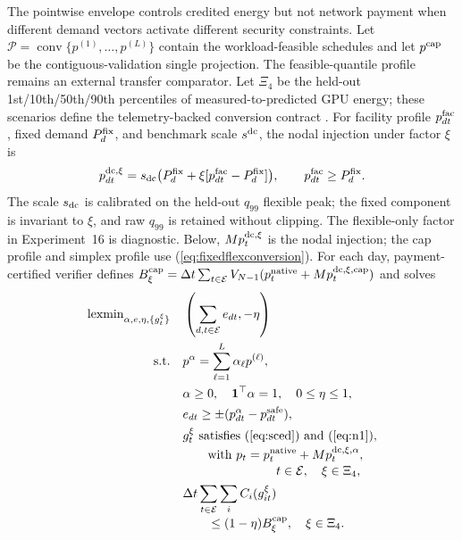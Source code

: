 \documentclass[10pt,journal]{IEEEtran}
\newcommand{\PaymentSafe}{payment-certified verifier}
\newcommand{\dt}{\Delta t}
\begin{document}
The pointwise envelope controls credited energy but not network payment when
different demand vectors activate different security constraints. Let
$\mathcal P=\operatorname{conv}\{p^{(1)},\ldots,p^{(L)}\}$ contain the
workload-feasible schedules and let $p^{\rm cap}$ be the contiguous-validation
single projection. The feasible-quantile profile remains an external transfer
comparator. Let $\Xi_4$ be the held-out 1st/10th/50th/90th percentiles of
measured-to-predicted GPU energy; these scenarios define the telemetry-backed
conversion contract \cite{samsi2021supercloud}. For facility profile
$p^{\rm fac}_{dt}$, fixed demand $P^{\rm fix}_d$, and benchmark scale
$s^{\rm dc}$, the nodal injection under factor $\xi$ is
\begin{equation}
 p^{\rm dc,\xi}_{dt}=s_{\rm dc}\bigl(P^{\rm fix}_d+\xi[p^{\rm fac}_{dt}-P^{\rm fix}_d]\bigr),
 \qquad p^{\rm fac}_{dt}\geq P^{\rm fix}_d .
 \label{eq:fixedflexconversion}
\end{equation}
The scale $s_{\rm dc}$ is calibrated on the held-out $q_{99}$ flexible peak;
the fixed component is invariant to $\xi$, and raw $q_{99}$ is retained without
clipping. The flexible-only factor in Experiment~16 is diagnostic. Below,
$M p^{\rm dc,\xi}_t$ is the nodal injection; the cap profile and simplex profile
use (\ref{eq:fixedflexconversion}).
For each day, \PaymentSafe{} defines
$B_\xi^{\rm cap}=\dt\sum_{t\in\mathcal E}
V_{N-1}(p_t^{\rm native}+M p_t^{\rm dc,\xi,cap})$ and solves
\begin{align}
\operatorname{lexmin}_{\alpha,e,\eta,\{g_t^\xi\}}\quad&
 \left(\sum_{d,t\in\mathcal E}e_{dt},-\eta\right)
 \label{eq:paymentcert}\\
\mathrm{s.t.}\quad&
 p^\alpha=\sum_{\ell=1}^{L}\alpha_\ell p^{(\ell)},\nonumber\\
&\alpha\geq0,\quad\mathbf1^\top\alpha=1,\quad 0\leq\eta\leq1,\nonumber\\
&e_{dt}\geq\pm(p^\alpha_{dt}-p^{\rm safe}_{dt}),\nonumber\\
&g_t^\xi\ \text{satisfies (\ref{eq:sced}) and (\ref{eq:n1})},\nonumber\\[-2pt]
&\hspace{2em}\text{with }p_t=p_t^{\rm native}+M p_t^{\rm dc,\xi,\alpha},\nonumber\\[-2pt]
&\hspace{7.5em}t\in\mathcal E,\quad \xi\in\Xi_4,\nonumber\\
&\dt\sum_{t\in\mathcal E}\sum_iC_i(g_{it}^\xi)\nonumber\\[-2pt]
&\hspace{2em}\leq(1-\eta)B_\xi^{\rm cap},
\quad \xi\in\Xi_4.\nonumber
\end{align}
\end{document}
